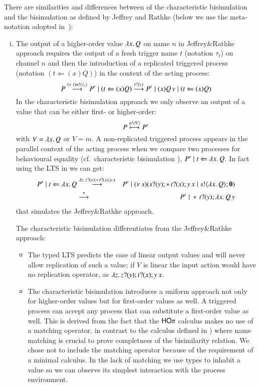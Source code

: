 There are similarities and differences between of the characteristic bisimulation
and the bisimulation as defined by Jeffrey and Rathke
(below we use the meta-notation adopted in~\cite{DBLP:journals/lmcs/JeffreyR05}):
%
\begin{enumerate}[i)]
	\item	The output of a higher-order value $\lambda x.\,Q$ on name
		$n$ in Jeffrey\&Rathke approach requires the output of
		a fresh trigger name $t$ (notation $\tau_t$)
		on channel $n$ 
		and then the introduction of a replicated triggered process
		(notation $(t \Leftarrow (x) Q)$)
		in the context of the acting process:
		\[
			P \stackrel{(\nu\ t) n ! \langle \tau_{t} \rangle}{\longrightarrow} P' \;|\; (t \Leftarrow (x) Q) \stackrel{t ? \langle v \rangle}{\longrightarrow} P' \;|\; (x) Q\,v \;|\; (t \Leftarrow (x) Q) 
		\]
		In the characteristic bisimulation approach we only observe
		an output of a value that can be either first- or higher-order:
		\[
			P \stackrel{n ! \langle V \rangle}{\longmapsto} P' 
		\]
		with $V = \lambda x.\,Q$ or $V = m$.
		A non-replicated triggered process appears in
		the parallel context of the acting process when
		we compare two processes for behavioural equality
		(cf.~characteristic bisimulation ),
		$P' \;|\; t \Leftarrow \lambda x.\,Q$.
		In fact using the LTS in
		 we can get:
		\begin{eqnarray*}
			P' \;|\; t \Leftarrow \lambda x.\,Q
			&\stackrel{\lambda z.\,z ? (y) ; \ast\,{} t ? (x) ; y\,x}{\longrightarrow}&
			P' \;|\; (\nu\ s)(s ? (y) ; \ast\,{} t ? (x) ; y\,x \;|\; s ! \langle \lambda x.\,Q \rangle ; \mathbf{0})\\
			&\stackrel{\tau}{\longrightarrow}&
			P' \;|\; \ast\,{}t ? (y) ; \lambda x.\,Q\,y
		\end{eqnarray*}
		that simulates the Jeffrey\&Rathke approach.

		The characteristic bisimulation differentiates from
		the Jeffrey\&Rathke approach:
		\begin{itemize}
			\item	The typed LTS predicts the case of linear
				output values and will never allow replication
				of such a value;
				if $V$ is linear the input action would have no replication
				operator, as
				$\lambda z.\,z ? (y) ; t ? (x) ; y\,x$.

			\item	The characteristic bisimulation introduces a uniform approach
				not only for
				higher-order values but for first-order values
				as well. A triggered process can accept any
				process that can substitute a first-order value as well.
				This is derived from the fact that the $\mathsf{HO}\pi$
				calculus makes no use of a matching operator, in contrast
				to the calculus defined in \cite{DBLP:journals/lmcs/JeffreyR05})
				where name matching is crucial to prove completness
				of the bisimilarity relation.
				We chose not to include the matching operator
				because of the requirement of a minimal calculus.
				In the lack of matching we use types to inhabit
				a value so we can observe its simplest interaction
				with the process environment.


\end{itemize}
\end{enumerate}
